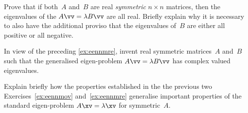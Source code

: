 \begin{exercise} \label{ex:eennmre} 
Prove that if both~\(A\) and~\(B\) are real \emph{symmetric} \(n\times n\) matrices, then the eigenvalues of the  \(A\vv=\lambda B\vv\) are all real.
Briefly explain why it is necessary to also have the additional proviso that the eigenvalues of~\(B\) are either all positive or all negative.
\end{exercise}


\begin{exercise} \label{ex:} 
In view of the preceding \autoref{ex:eennmre},
invent real symmetric matrices~\(A\) and~\(B\) such that the generalised eigen-problem \(A\vv=\lambda B\vv\) has complex valued eigenvalues.
\end{exercise}



\begin{exercise} \label{ex:} 
Explain briefly how the properties established in the the previous two Exercises~\ref{ex:eennmov} and~\ref{ex:eennmre} generalise important properties of the standard eigen-problem \(A\xv=\lambda\xv\) for symmetric~\(A\).
\end{exercise}






